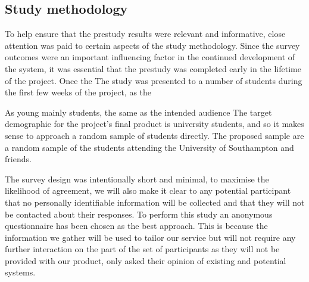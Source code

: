 
\subsection{Study methodology}

To help ensure that the prestudy results were relevant and informative, close attention was paid to certain aspects of the study methodology.
Since the survey outcomes were an important influencing factor in the continued development of the system, it was essential that the prestudy was completed early in the lifetime of the project. Once the 
The study was presented to a number of students during the first few weeks of the project, as the 

As young 
mainly students, the same as the intended audience
The target demographic for the project's final product is university students, and so it makes sense to approach a random sample of students directly.
The proposed sample are a random sample of the students attending the University of Southampton and friends.



The survey design was intentionally short and minimal, to maximise the likelihood of agreement, we will also make it clear to any potential participant that no personally identifiable information will be collected and that they will not be contacted about their responses. %
To perform this study an anonymous questionnaire has been chosen as the best approach.
This is because the information we gather will be used to tailor our service but will not require any further interaction on the part of the set of participants as they will not be provided with our product, only asked their opinion of existing and potential systems.


